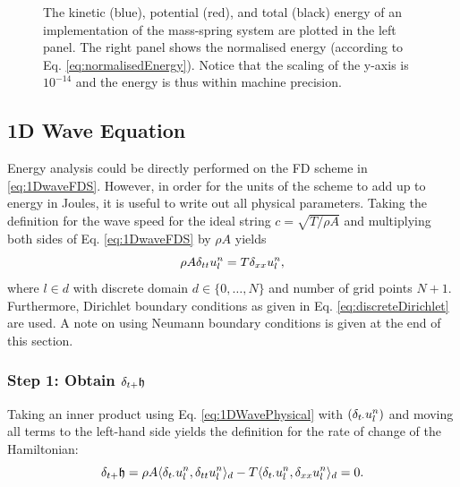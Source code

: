 {{\begin{figure}[h]
      \caption{The kinetic (blue), potential (red), and total (black) energy of an implementation of the mass-spring system are plotted in the left panel. The right panel shows the normalised energy (according to Eq. \eqref{eq:normalisedEnergy}). Notice that the scaling of the y-axis is $10^{-14}$ and the energy is thus within machine precision. \label{fig:energyMassSpring}}
\end{figure}

\subsection{1D Wave Equation}\label{sec:1DWaveEnergyAnalysis}
Energy analysis could be directly performed on the FD scheme in \eqref{eq:1DwaveFDS}. However, in order for the units of the scheme to add up to energy in Joules, it is useful to write out all physical parameters. Taking the definition for the wave speed for the ideal string $c = \sqrt{T/\rho A}$ and multiplying both sides of Eq. \eqref{eq:1DwaveFDS} by $\rho A$ yields
\begin{equation}\label{eq:1DWavePhysical}
    \rho A \delta_{tt} u_l^n = T \delta_{xx} u_l^n,
\end{equation}
where $l\in d$ with discrete domain $d\in\{0, \hdots, N\}$ and number of grid points $N+1$. Furthermore, Dirichlet boundary conditions as given in Eq. \eqref{eq:discreteDirichlet} are used. A note on using Neumann boundary conditions is given at the end of this section.

\subsubsection{Step 1: Obtain $\delta_{t+} \mathfrak{h}$}
Taking an inner product using Eq. \eqref{eq:1DWavePhysical} with $\left( \delta_{t\cdot} u_l^n \right)$ and moving all terms to the left-hand side yields the definition for the rate of change of the Hamiltonian:
\begin{equation}\label{eq:rOC1DWave}
    \delta_{t+} \mathfrak{h} = \rho A \langle \delta_{t\cdot} u_l^n, \delta_{tt} u_l^n \rangle_d - T \langle \delta_{t\cdot}u_l^n, \delta_{xx} u_l^n\rangle_d = 0.
\end{equation}


}}
